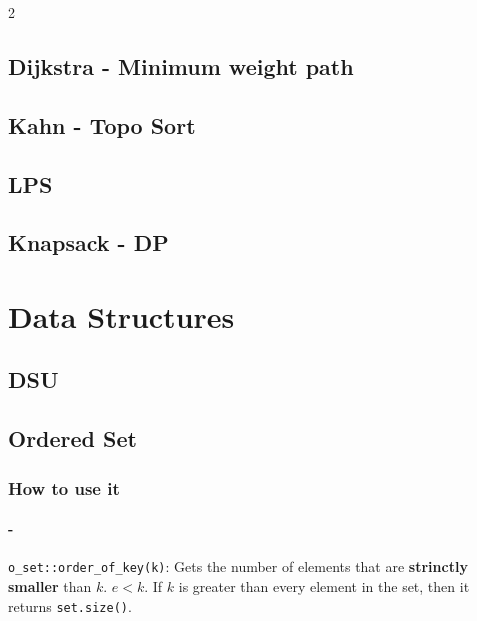 \documentclass[8pt, letterpaper]{article}
\begin{document}
\begin{multicols}{2}
\subsection{Dijkstra - Minimum weight path}


\subsection{Kahn - Topo Sort}


\subsection{LPS}


\subsection{Knapsack - DP}


%









\section{Data Structures}
\subsection{DSU}


\subsection{Ordered Set}


\subsubsection{How to use it}

\paragraph{-} \verb|o_set::order_of_key(k)|: Gets the number of elements that are \textbf{strinctly smaller} than $k$. $e < k$. If $k$ is greater than every element in the set, then it returns \verb|set.size()|.


\end{multicols}
\end{document}
